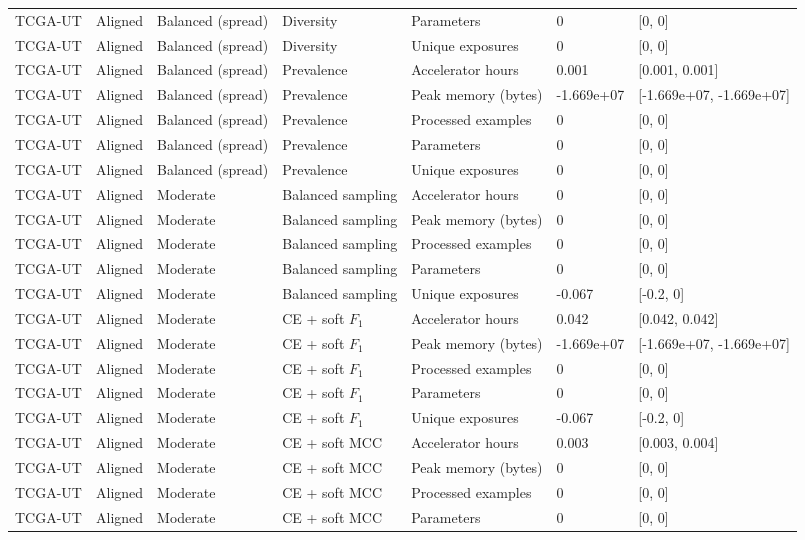 \begin{longtable}{lllllll}
TCGA-UT & Aligned & Balanced (spread) & Diversity & Parameters & 0 & [0, 0] \\
TCGA-UT & Aligned & Balanced (spread) & Diversity & Unique exposures & 0 & [0, 0] \\
TCGA-UT & Aligned & Balanced (spread) & Prevalence & Accelerator hours & 0.001 & [0.001, 0.001] \\
TCGA-UT & Aligned & Balanced (spread) & Prevalence & Peak memory (bytes) & -1.669e+07 & [-1.669e+07, -1.669e+07] \\
TCGA-UT & Aligned & Balanced (spread) & Prevalence & Processed examples & 0 & [0, 0] \\
TCGA-UT & Aligned & Balanced (spread) & Prevalence & Parameters & 0 & [0, 0] \\
TCGA-UT & Aligned & Balanced (spread) & Prevalence & Unique exposures & 0 & [0, 0] \\
TCGA-UT & Aligned & Moderate & Balanced sampling & Accelerator hours & 0 & [0, 0] \\
TCGA-UT & Aligned & Moderate & Balanced sampling & Peak memory (bytes) & 0 & [0, 0] \\
TCGA-UT & Aligned & Moderate & Balanced sampling & Processed examples & 0 & [0, 0] \\
TCGA-UT & Aligned & Moderate & Balanced sampling & Parameters & 0 & [0, 0] \\
TCGA-UT & Aligned & Moderate & Balanced sampling & Unique exposures & -0.067 & [-0.2, 0] \\
TCGA-UT & Aligned & Moderate & CE + soft $F_1$ & Accelerator hours & 0.042 & [0.042, 0.042] \\
TCGA-UT & Aligned & Moderate & CE + soft $F_1$ & Peak memory (bytes) & -1.669e+07 & [-1.669e+07, -1.669e+07] \\
TCGA-UT & Aligned & Moderate & CE + soft $F_1$ & Processed examples & 0 & [0, 0] \\
TCGA-UT & Aligned & Moderate & CE + soft $F_1$ & Parameters & 0 & [0, 0] \\
TCGA-UT & Aligned & Moderate & CE + soft $F_1$ & Unique exposures & -0.067 & [-0.2, 0] \\
TCGA-UT & Aligned & Moderate & CE + soft MCC & Accelerator hours & 0.003 & [0.003, 0.004] \\
TCGA-UT & Aligned & Moderate & CE + soft MCC & Peak memory (bytes) & 0 & [0, 0] \\
TCGA-UT & Aligned & Moderate & CE + soft MCC & Processed examples & 0 & [0, 0] \\
TCGA-UT & Aligned & Moderate & CE + soft MCC & Parameters & 0 & [0, 0] \\

\end{longtable}
